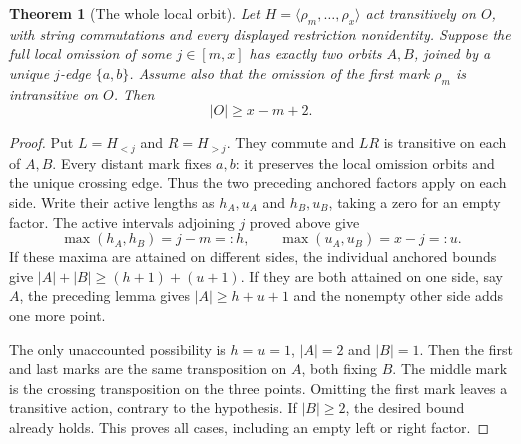 \documentclass[11pt,a4paper]{article}
\newtheorem{theorem}[lemma]{Theorem}
\newcommand{\gen}[1]{\langle#1\rangle}
\begin{document}
\begin{theorem}[The whole local orbit]
Let $H=\gen{\rho_m,\ldots,\rho_x}$ act transitively
on $O$, with string commutations and every displayed
restriction nonidentity. Suppose the full local
omission of some $j\in[m,x]$ has exactly two
orbits $A,B$, joined by a unique $j$-edge $\{a,b\}$.
Assume also that the omission of the first mark
$\rho_m$ is intransitive on $O$. Then
\[
                            |O|\ge x-m+2.
\]
\end{theorem}
\begin{proof}
Put $L=H_{<j}$ and $R=H_{>j}$. They commute and
$LR$ is transitive on each of $A,B$. Every distant
mark fixes $a,b$: it preserves the local omission
orbits and the unique crossing edge. Thus the
two preceding anchored factors apply on each side.
Write their active lengths as $h_A,u_A$ and
$h_B,u_B$, taking a zero for an empty factor.
The active intervals adjoining $j$ proved above
give
\[
      \max(h_A,h_B)=j-m=:h,\qquad
      \max(u_A,u_B)=x-j=:u.
\]
If these maxima are attained on different sides,
the individual anchored bounds give
$|A|+|B|\ge(h+1)+(u+1)$.
If they are both attained on one side, say $A$,
the preceding lemma gives $|A|\ge h+u+1$ and
the nonempty other side adds one more point.

The only unaccounted possibility is $h=u=1$,
$|A|=2$ and $|B|=1$. Then the first and last
marks are the same transposition on $A$, both
fixing $B$. The middle mark is the crossing
transposition on the three points. Omitting the
first mark leaves a transitive action, contrary
to the hypothesis. If $|B|\ge2$, the desired
bound already holds. This proves all cases,
including an empty left or right factor.
\end{proof}
\end{document}
